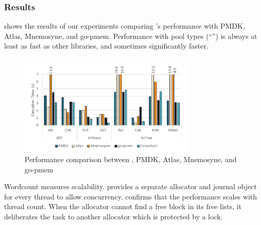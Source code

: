 \subsubsection{Results}
\label{sec:res:perf:res}


 shows the results of our experiments comparing \this{}'s performance with PMDK, Atlas, Mnemosyne, and go-pmem. 
Performance with pool types (``\this{}'') is always at least as fast as other libraries,
and sometimes significantly faster.

\begin{figure}
    \begin{center}
    \includegraphics[width=3.3in]{Graphs/perf.pdf}
    \end{center}
    \caption{\label{fig:perf} Performance comparison between \this{}, PMDK, Atlas, Mnemosyne, and go-pmem}
\end{figure}

Wordcount measures scalability.  \This{} provides
a separate allocator and journal object for every thread to allow concurrency. %
 confirms that the performance scales with thread count.
When the allocator cannot find a free block in its free lists, it deliberates the task to another allocator which is protected by a lock.

